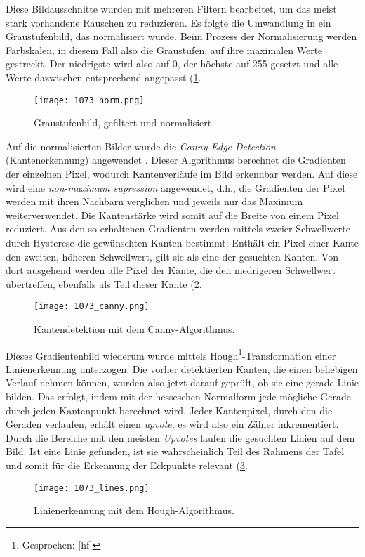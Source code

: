 Diese Bildausschnitte wurden mit mehreren Filtern bearbeitet, um das meist stark vorhandene Rauschen zu reduzieren. Es folgte die Umwandlung in ein Graustufenbild, das normalisiert wurde. Beim Prozess der Normalisierung werden Farbskalen, in diesem Fall also die Graustufen, auf ihre maximalen Werte gestreckt. Der niedrigste wird also auf 0, der höchste auf 255 gesetzt und alle Werte dazwischen entsprechend angepasst (\ref{fig:norm}.

\begin{figure}[h!]
\centering
\texttt{[image: 1073\_norm.png]}
\caption{Graustufenbild, gefiltert und normalisiert.}
\label{fig:norm}
\end{figure}

Auf die normalisierten Bilder wurde die \textit{Canny Edge Detection} (Kantenerkennung) angewendet \cite{cannyedge}. Dieser Algorithmus berechnet die Gradienten der einzelnen Pixel, wodurch Kantenverläufe im Bild erkennbar werden. Auf diese wird eine \textit{non-maximum supression} angewendet, d.h., die Gradienten der Pixel werden mit ihren Nachbarn verglichen und jeweils nur das Maximum weiterverwendet. Die Kantenstärke wird somit auf die Breite von einem Pixel reduziert. Aus den so erhaltenen Gradienten werden mittels zweier Schwellwerte durch Hysterese die gewünschten Kanten bestimmt: Enthält ein Pixel einer Kante den zweiten, höheren Schwellwert, gilt sie als eine der gesuchten Kanten. Von dort ausgehend werden alle Pixel der Kante, die den niedrigeren Schwellwert übertreffen, ebenfalls als Teil dieser Kante (\ref{fig:canny}.
\begin{figure}[h!]
\centering
\texttt{[image: 1073\_canny.png]}
\caption{Kantendetektion mit dem Canny-Algorithmus.}
\label{fig:canny}
\end{figure}

Dieses Gradientenbild wiederum wurde mittels Hough\footnote{Gesprochen: [h\textturnv{}f]}-Transformation \cite{houghpatent} einer Linienerkennung unterzogen. Die vorher detektierten Kanten, die einen beliebigen Verlauf nehmen können, wurden also jetzt darauf geprüft, ob sie eine gerade Linie bilden. Das erfolgt, indem mit der hesseschen Normalform jede mögliche Gerade durch jeden Kantenpunkt berechnet wird. Jeder Kantenpixel, durch den die Geraden verlaufen, erhält einen \textit{upvote}, es wird also ein Zähler inkrementiert. Durch die Bereiche mit den meisten \textit{Upvotes} laufen die gesuchten Linien auf dem Bild. Ist eine Linie gefunden, ist sie wahrscheinlich Teil des Rahmens der Tafel und somit für die Erkennung der Eckpunkte relevant (\ref{fig:lines}.
\begin{figure}[h!]
\centering
\texttt{[image: 1073\_lines.png]}
\caption{Linienerkennung mit dem Hough-Algorithmus.}
\label{fig:lines}
\end{figure}

